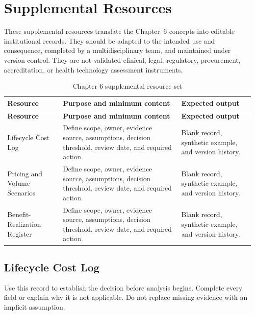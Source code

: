 \section{Supplemental Resources}
\label{sec:comp-ch06-supplemental}

These supplemental resources translate the Chapter~6 concepts into editable
institutional records. They should be adapted to the intended use and consequence,
completed by a multidisciplinary team, and maintained under version control. They
are not validated clinical, legal, regulatory, procurement, accreditation, or health
technology assessment instruments.

\begin{longtable}{@{}p{}p{}p{}@{}}
\caption{Chapter 6 supplemental-resource set}
\label{tab:comp-ch06-supplemental-set}\\
\toprule
\textbf{Resource} & \textbf{Purpose and minimum content} & \textbf{Expected output} \\
\midrule
\endfirsthead
\toprule
\textbf{Resource} & \textbf{Purpose and minimum content} & \textbf{Expected output} \\
\midrule
\endhead
\bottomrule
\endlastfoot
Lifecycle Cost Log & Define scope, owner, evidence source, assumptions, decision threshold, review date, and required action. & Blank record, synthetic example, and version history. \\
Pricing and Volume Scenarios & Define scope, owner, evidence source, assumptions, decision threshold, review date, and required action. & Blank record, synthetic example, and version history. \\
Benefit-Realization Register & Define scope, owner, evidence source, assumptions, decision threshold, review date, and required action. & Blank record, synthetic example, and version history. \\
\end{longtable}

\subsection{Lifecycle Cost Log}
\label{sec:comp-ch06-supp-1}
Use this record to establish the decision before analysis begins. Complete every
field or explain why it is not applicable. Do not replace missing evidence with an
implicit assumption.

